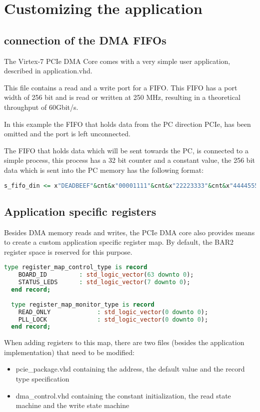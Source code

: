 \section{Customizing the application}
\subsection{connection of the DMA FIFOs}
The Virtex-7 PCIe DMA Core comes with a very simple user application, described in application.vhd.

This file contains a read and a write port for a FIFO. This FIFO has a port width of 256 bit and is read or written at 250 MHz, resulting in a theoretical throughput of 60Gbit/s.

In this example the FIFO that holds data from the PC direction PCIe, has been omitted and the port is left unconnected.

The FIFO that holds data which will be sent towards the PC, is connected to a simple process, this process has a 32 bit counter and a constant value, the 256 bit data which is sent into the PC memory has the following format:

\begin{lstlisting}[language=VHDL, frame=single, caption=Data format of example application]
s_fifo_din <= x"DEADBEEF"&cnt&x"00001111"&cnt&x"22223333"&cnt&x"44445555"&cnt;
\end{lstlisting}
\newpage
\subsection{Application specific registers}
Besides DMA memory reads and writes, the PCIe DMA core also provides means to create a custom application specific register map. By default, the BAR2 register space is reserved for this purpose.

\begin{lstlisting}[language=VHDL, frame=single, caption=custom register types]
  type register_map_control_type is record
    BOARD_ID         : std_logic_vector(63 downto 0);    
    STATUS_LEDS      : std_logic_vector(7 downto 0);
  end record;
  
  type register_map_monitor_type is record
    READ_ONLY             : std_logic_vector(0 downto 0);    
    PLL_LOCK              : std_logic_vector(0 downto 0);    
  end record;
\end{lstlisting}

When adding registers to this map, there are two files (besides the application implementation) that need to be modified:
\begin{itemize}
 \item{pcie\_package.vhd} containing the address, the default value and the record type specification
 \item{dma\_control.vhd} containing the constant initialization, the read state machine and the write state machine
\end{itemize}

